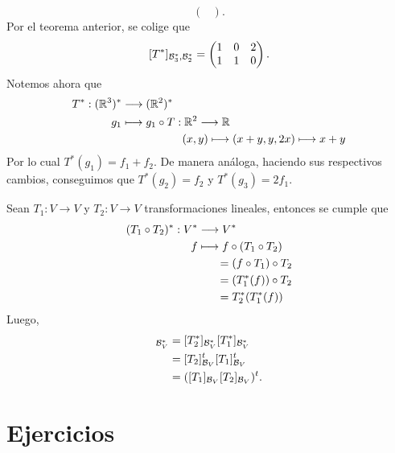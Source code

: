\documentclass[12pt,a4paper]{book}
\begin{document}
\begin{ejemplo}
\[\begin{pmatrix}
        \end{pmatrix}.
        \]
        Por el teorema anterior, se colige que
        \[
        [T^*]_{\mathcal{B}^*_3, \mathcal{B}_2^*} = 
        \begin{pmatrix}
            1 & 0 & 2\\
            1 & 1 & 0\\
        \end{pmatrix}.
        \]
        Notemos ahora que
        \begin{equation*}
            \begin{aligned}
                T^*: (\mathbb{R}^3)^* & \longrightarrow (\mathbb{R}^2)^* \\
                g_1 & \longmapsto g_1 \circ T: \mathbb{R}^2 \longrightarrow \mathbb{R}\\
                &\hspace{1.9cm}   (x, y)\longmapsto (x + y, y, 2x) \longmapsto x + y
            \end{aligned}
        \end{equation*}
        Por lo cual $T^*(g_1) = f_1 + f_2$. De manera análoga, haciendo sus respectivos cambios, conseguimos que $T^*(g_2) = f_2$ y $T^*(g_3) = 2f_1$.
    \end{ejemplo}


    Sean $T_1: V \to V$ y $T_2: V \to V$ transformaciones lineales, entonces se cumple que
    \begin{align*}
        (T_1 \circ T_2)^*: V^* & \longrightarrow V^*\\
        f & \longmapsto f \circ(T_1 \circ T_2)\\
        & \hspace{0.6cm} = (f \circ T_1) \circ T_2\\
        & \hspace{0.6cm} = (T_1^*(f)) \circ T_2\\
        & \hspace{0.6cm} = T^*_2(T_1^*(f))
    \end{align*}
    Luego,
    \begin{align*}
        [T_2^* \circ T_1^*]_{\BB_V^*} & = [T_2^*]_{\BB_V^*}[T_1^*]_{\BB_V^*}\\
        & = [T_2]^t_{\BB_V}[T_1]^t_{\BB_V}\\
        & = ([T_1]_{\BB_V}[T_2]_{\BB_V})^t.
    \end{align*}

    \section{Ejercicios}
\end{document}
